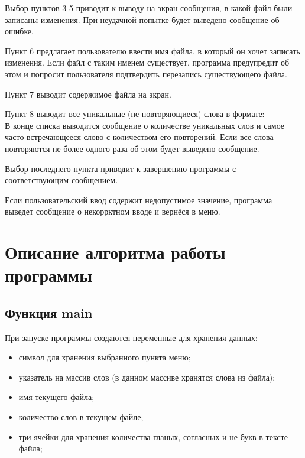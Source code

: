 \documentclass[12pt,a4paper]{article}  %
\begin{document}
Выбор пунктов 3-5 приводит к выводу на экран сообщения, в какой файл были записаны изменения. При неудачной попытке будет выведено сообщение об ошибке.

Пункт 6 предлагает пользователю ввести имя файла, в который он хочет записать изменения. Если файл с таким именем существует, программа предупредит об этом и попросит пользователя подтвердить перезапись существующего файла.

Пункт 7 выводит содержимое файла на экран.

Пункт 8 выводит все уникальные (не повторяющиеся) слова в формате:\\
В конце списка выводится сообщение о количестве уникальных слов и самое часто встречающееся слово с количеством его повторений. Если все слова повторяются не более одного раза об этом будет выведено сообщение.

Выбор последнего пункта приводит к завершению программы с соответствующим сообщением.

Если пользовательский ввод содержит недопустимое значение, программа выведет сообщение о некоррктном вводе и вернёся в меню.
\newpage
\section{Описание алгоритма работы программы}
\setcounter{figure}{0}

\subsection*{Функция main}

При запуске программы создаются переменные для хранения данных:
\begin{itemize}
	\item символ для хранения выбранного пункта меню;
	\item указатель на массив слов (в данном массиве хранятся слова из файла);
	\item имя текущего файла;
	\item количество слов в текущем файле;
	\item три ячейки для хранения количества гланых, согласных и не-букв в тексте файла;
\end{itemize}
\end{document}
